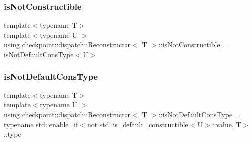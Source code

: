 \mbox{\label{structcheckpoint_1_1dispatch_1_1_reconstructor_a6220795c08856d2f0d86f1659647e2f0}} 
\subsubsection{\texorpdfstring{is\+Not\+Constructible}{isNotConstructible}}
{\footnotesize\ttfamily template$<$typename T$>$ \\
template$<$typename U $>$ \\
using \hyperlink{structcheckpoint_1_1dispatch_1_1_reconstructor}{checkpoint\+::dispatch\+::\+Reconstructor}$<$ T $>$\+::\hyperlink{structcheckpoint_1_1dispatch_1_1_reconstructor_a6220795c08856d2f0d86f1659647e2f0}{is\+Not\+Constructible} =  \hyperlink{structcheckpoint_1_1dispatch_1_1_reconstructor_a0062e5edfdd87b34c3e5464d1f1020ec}{is\+Not\+Default\+Cons\+Type}$<$U$>$}

\mbox{\label{structcheckpoint_1_1dispatch_1_1_reconstructor_a0062e5edfdd87b34c3e5464d1f1020ec}} 
\subsubsection{\texorpdfstring{is\+Not\+Default\+Cons\+Type}{isNotDefaultConsType}}
{\footnotesize\ttfamily template$<$typename T$>$ \\
template$<$typename U $>$ \\
using \hyperlink{structcheckpoint_1_1dispatch_1_1_reconstructor}{checkpoint\+::dispatch\+::\+Reconstructor}$<$ T $>$\+::\hyperlink{structcheckpoint_1_1dispatch_1_1_reconstructor_a0062e5edfdd87b34c3e5464d1f1020ec}{is\+Not\+Default\+Cons\+Type} =  typename std\+::enable\+\_\+if$<$not std\+::is\+\_\+default\+\_\+constructible$<$U$>$\+::value, T$>$\+::type}



